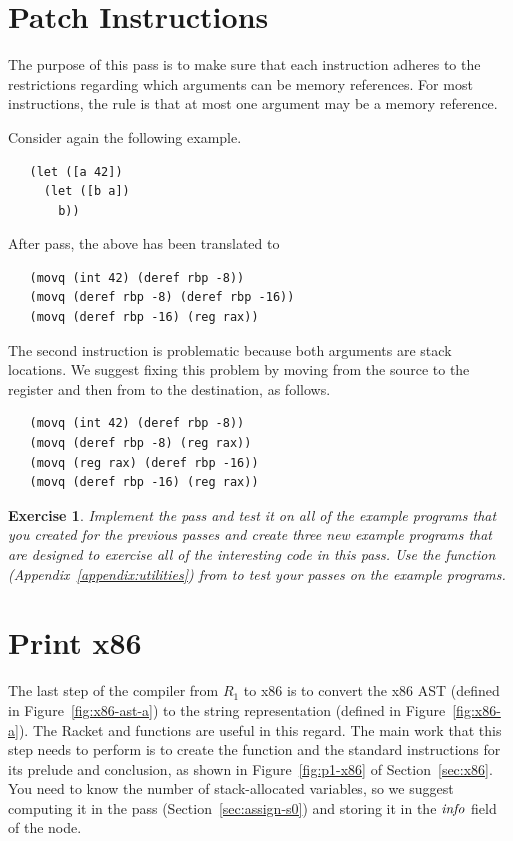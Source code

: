\documentclass[11pt]{book}
\newtheorem{exercise}[theorem]{Exercise}
\begin{document}
\section{Patch Instructions}
\label{sec:patch-s0}

The purpose of this pass is to make sure that each instruction adheres
to the restrictions regarding which arguments can be memory
references. For most instructions, the rule is that at most one
argument may be a memory reference.

Consider again the following example.
\begin{lstlisting}
   (let ([a 42])
     (let ([b a])
       b))
\end{lstlisting}
After  pass, the above has been translated to
\begin{lstlisting}
   (movq (int 42) (deref rbp -8))
   (movq (deref rbp -8) (deref rbp -16))
   (movq (deref rbp -16) (reg rax))
\end{lstlisting}
The second  instruction is problematic because both
arguments are stack locations. We suggest fixing this problem by
moving from the source to the register  and then from
 to the destination, as follows.
\begin{lstlisting}
   (movq (int 42) (deref rbp -8))
   (movq (deref rbp -8) (reg rax))
   (movq (reg rax) (deref rbp -16))
   (movq (deref rbp -16) (reg rax))
\end{lstlisting}

\begin{exercise}
\normalfont
Implement the  pass and test it on all of the
example programs that you created for the previous passes and create
three new example programs that are designed to exercise all of the
interesting code in this pass. Use the  function
(Appendix~\ref{appendix:utilities}) from  to test
your passes on the example programs.
\end{exercise}


\section{Print x86}
\label{sec:print-x86}

The last step of the compiler from $R_1$ to x86 is to convert the x86
AST (defined in Figure~\ref{fig:x86-ast-a}) to the string
representation (defined in Figure~\ref{fig:x86-a}). The Racket
 and  functions are useful in this
regard. The main work that this step needs to perform is to create the
 function and the standard instructions for its prelude and
conclusion, as shown in Figure~\ref{fig:p1-x86} of
Section~\ref{sec:x86}. You need to know the number of stack-allocated
variables, so we suggest computing it in the  pass
(Section~\ref{sec:assign-s0}) and storing it in the $\mathit{info}$ field
of the  node.
\end{document}
